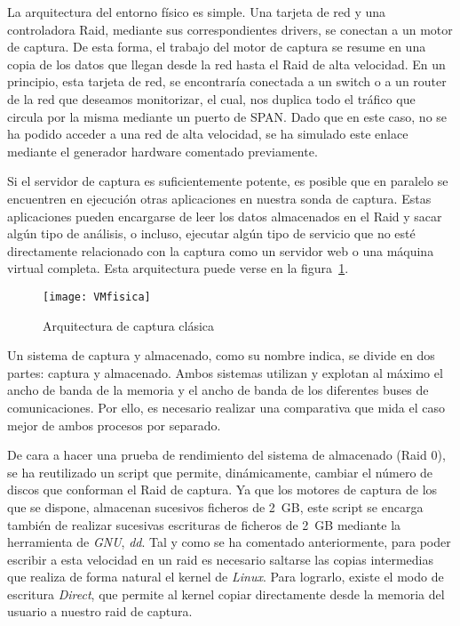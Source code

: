 La arquitectura del entorno físico es simple. Una tarjeta de red y una controladora Raid, mediante sus correspondientes drivers, se conectan a un motor de captura. De esta forma, el trabajo del motor de captura se resume en una copia de los datos que llegan desde la red hasta el Raid de alta velocidad. En un principio, esta tarjeta de red, se encontraría conectada a un switch o a un router de la red que deseamos monitorizar, el cual, nos duplica todo el tráfico que circula por la misma mediante un puerto de SPAN. Dado que en este caso, no se ha podido acceder a una red de alta velocidad, se ha simulado este enlace mediante el generador hardware comentado previamente.

Si el servidor de captura es suficientemente potente, es posible que en paralelo se encuentren en ejecución otras aplicaciones en nuestra sonda de captura. Estas aplicaciones pueden encargarse de leer los datos almacenados en el Raid y sacar algún tipo de análisis, o incluso, ejecutar algún tipo de servicio que no esté directamente relacionado con la captura como un servidor web o una máquina virtual completa. Esta arquitectura puede verse en la figura~\ref{fig:vmfisica}.

\begin{figure}[!htb]
\centering
\texttt{[image: VMfisica]}
\caption{Arquitectura de captura clásica}
\label{fig:vmfisica}
\end{figure}

Un sistema de captura y almacenado, como su nombre indica, se divide en dos partes: captura y almacenado. Ambos sistemas utilizan y explotan al máximo el ancho de banda de la memoria y el ancho de banda de los diferentes buses de comunicaciones. Por ello, es necesario realizar una comparativa que mida el caso mejor de ambos procesos por separado.

De cara a hacer una prueba de rendimiento del sistema de almacenado (Raid 0), se ha reutilizado un script que permite, dinámicamente, cambiar el número de discos que conforman el Raid de captura. Ya que los motores de captura de los que se dispone, almacenan sucesivos ficheros de 2~GB, este script se encarga también de realizar sucesivas escrituras de ficheros de 2~GB mediante la herramienta de \textit{GNU}, \textit{dd}. Tal y como se ha comentado anteriormente, para poder escribir a esta velocidad en un raid es necesario saltarse las copias intermedias que realiza de forma natural el kernel de \textit{Linux}. Para lograrlo, existe el modo de escritura \textit{Direct}, que permite al kernel copiar directamente desde la memoria del usuario a nuestro raid de captura.


